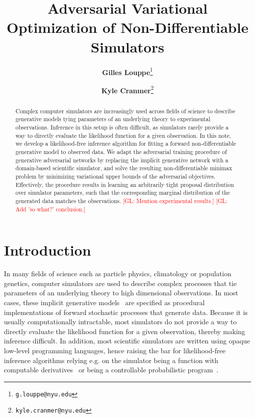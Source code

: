 \documentclass[twocolumn,superscriptaddress,aps]{revtex4-1}
\newcommand{\glnote}[1]{\textcolor{red}{[GL: #1]}}
\theoremstyle{plain}
\begin{document}

\title{\Large{Adversarial Variational Optimization of Non-Differentiable Simulators}}
\vspace{1cm}
\author{\small{\bf Gilles Louppe}\thanks{\texttt{g.louppe@nyu.edu}}}
\author{\small{\bf Kyle Cranmer}\thanks{\texttt{kyle.cranmer@nyu.edu}}}

\begin{abstract}

Complex computer simulators are increasingly used across fields of science to
describe generative models tying parameters of an underlying theory to
experimental observations. Inference in this setup is often
difficult, as simulators rarely provide a way to directly evaluate the likelihood
function for a given observation. In this note, we develop a likelihood-free
inference algorithm for fitting a forward non-differentiable generative model to
observed data. We adapt the adversarial training procedure of generative
adversarial networks by replacing the implicit generative network with a
domain-based scientific simulator, and solve the resulting non-differentiable
minimax problem by minimizing variational upper bounds of the adversarial objectives.
Effectively, the procedure results in learning an arbitrarily tight
proposal distribution over simulator parameters, such that the corresponding
marginal distribution of the generated data matches the observations.
\glnote{Mention experimental results.}
\glnote{Add 'so what?' conclusion.}


\end{abstract}

\maketitle


\section{Introduction}

In many fields of science such as particle physics, climatology or population
genetics, computer simulators are used to describe complex processes that tie
parameters of an underlying theory to high dimensional observations. In most
cases, these implicit generative models~\citep{2016arXiv161003483M} are
specified as procedural implementations of forward stochastic processes that
generate data. Because it is usually computationally intractable, most simulators
do not provide a way to directly evaluate the likelihood function for a
given observation, thereby making inference difficult.
In addition, most scientific simulators are written using opaque low-level programming
languages, hence raising the bar for likelihood-free inference
algorithms relying e.g. on the simulator being a function with computable derivatives~\citep{2016arXiv160507826G}
or being a controllable probabilistic program~\citep{2016arXiv161009900L}.
\end{document}
